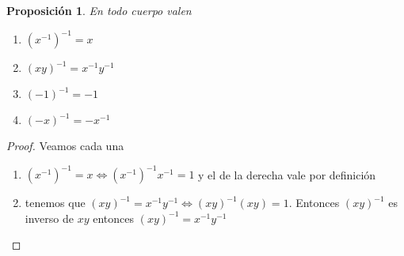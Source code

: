 \documentclass{article}
\theoremstyle{break}
\newtheorem{proposition}{Proposición}
\begin{document}
        \begin{proposition}
            En todo cuerpo valen
            \begin{enumerate}
                \item $(x^{-1})^{-1}=x$
                \item $(xy)^{-1} = x^{-1}y^{-1}$ 
                \item $(-1)^{-1}=-1$
                \item $(-x)^{-1} = -x^{-1}$
            \end{enumerate}
        \end{proposition}
        \begin{proof}
            Veamos cada una
            \begin{enumerate}
                \item $(x^{-1})^{-1}=x \iff (x^{-1})^{-1}x^{-1}=1$ y el de la derecha vale por definición
                \item tenemos que $(xy)^{-1} = x^{-1}y^{-1} \iff (xy)^{-1} (xy)=1$.
                Entonces $(xy)^{-1}$ es inverso de $xy$ entonces $(xy)^{-1} = x^{-1}y^{-1}$
            \end{enumerate}
        \end{proof}
\end{document}
